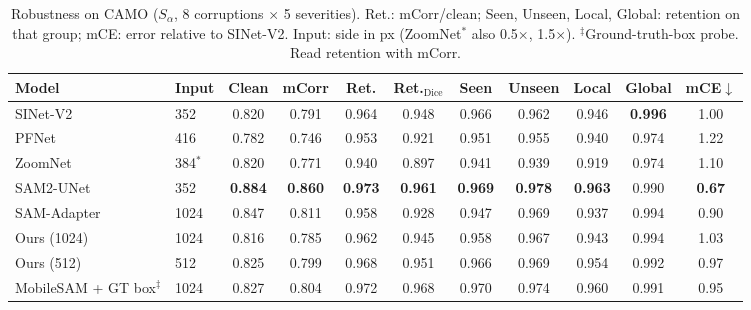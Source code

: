 \begin{table}[t]
\centering
\caption{Robustness on CAMO ($S_\alpha$, 8 corruptions $\times$ 5 severities). Ret.: mCorr/clean; Seen, Unseen, Local, Global: retention on that group; mCE: error relative to SINet-V2. Input: side in px (ZoomNet$^*$ also 0.5$\times$, 1.5$\times$). $^\ddagger$Ground-truth-box probe. Read retention with mCorr.}
\label{tab:robust-camo}
\footnotesize
\setlength{\tabcolsep}{4pt}
\begin{tabular}{llccccccccc}
\toprule
Model & Input & Clean & mCorr & Ret. & Ret.$_{\mathrm{Dice}}$ & Seen & Unseen & Local & Global & mCE$\downarrow$ \\
\midrule
SINet-V2 & 352 & 0.820 & 0.791 & 0.964 & 0.948 & 0.966 & 0.962 & 0.946 & \textbf{0.996} & 1.00 \\
PFNet & 416 & 0.782 & 0.746 & 0.953 & 0.921 & 0.951 & 0.955 & 0.940 & 0.974 & 1.22 \\
ZoomNet & 384$^*$ & 0.820 & 0.771 & 0.940 & 0.897 & 0.941 & 0.939 & 0.919 & 0.974 & 1.10 \\
\midrule
SAM2-UNet & 352 & \textbf{0.884} & \textbf{0.860} & \textbf{0.973} & \textbf{0.961} & \textbf{0.969} & \textbf{0.978} & \textbf{0.963} & 0.990 & \textbf{0.67} \\
SAM-Adapter & 1024 & 0.847 & 0.811 & 0.958 & 0.928 & 0.947 & 0.969 & 0.937 & 0.994 & 0.90 \\
\midrule
Ours (1024) & 1024 & 0.816 & 0.785 & 0.962 & 0.945 & 0.958 & 0.967 & 0.943 & 0.994 & 1.03 \\
Ours (512) & 512 & 0.825 & 0.799 & 0.968 & 0.951 & 0.966 & 0.969 & 0.954 & 0.992 & 0.97 \\
\midrule
MobileSAM + GT box$^\ddagger$ & 1024 & 0.827 & 0.804 & 0.972 & 0.968 & 0.970 & 0.974 & 0.960 & 0.991 & 0.95 \\
\bottomrule
\end{tabular}
\end{table}
